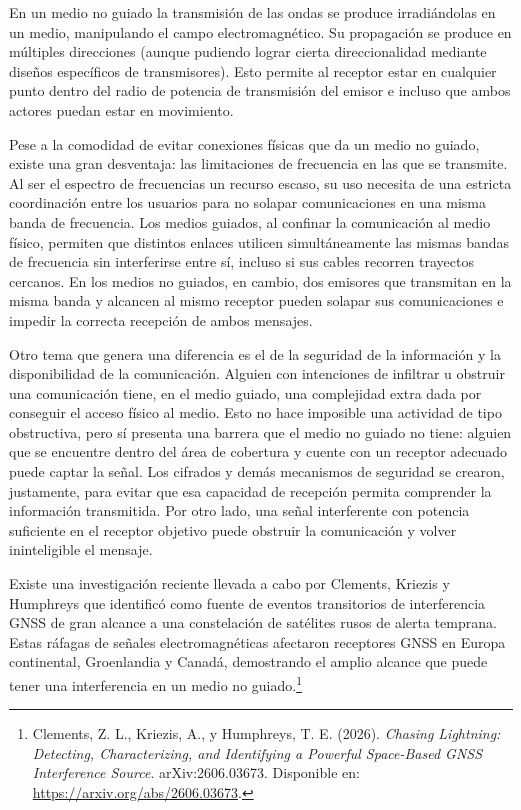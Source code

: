 \documentclass[11pt,a4paper]{article}
\begin{document}
En un medio no guiado la transmisión de las ondas se produce irradiándolas en un medio, manipulando el campo electromagnético. Su propagación se produce en múltiples direcciones (aunque pudiendo lograr cierta direccionalidad mediante diseños específicos de transmisores). Esto permite al receptor estar en cualquier punto dentro del radio de potencia de transmisión del emisor e incluso que ambos actores puedan estar en movimiento.

Pese a la comodidad de evitar conexiones físicas que da un medio no guiado, existe una gran desventaja: las limitaciones de frecuencia en las que se transmite. Al ser el espectro de frecuencias un recurso escaso, su uso necesita de una estricta coordinación entre los usuarios para no solapar comunicaciones en una misma banda de frecuencia. Los medios guiados, al confinar la comunicación al medio físico, permiten que distintos enlaces utilicen simultáneamente las mismas bandas de frecuencia sin interferirse entre sí, incluso si sus cables recorren trayectos cercanos. En los medios no guiados, en cambio, dos emisores que transmitan en la misma banda y alcancen al mismo receptor pueden solapar sus comunicaciones e impedir la correcta recepción de ambos mensajes.

Otro tema que genera una diferencia es el de la seguridad de la información y la disponibilidad de la comunicación. Alguien con intenciones de infiltrar u obstruir una comunicación tiene, en el medio guiado, una complejidad extra dada por conseguir el acceso físico al medio. Esto no hace imposible una actividad de tipo obstructiva, pero sí presenta una barrera que el medio no guiado no tiene: alguien que se encuentre dentro del área de cobertura y cuente con un receptor adecuado puede captar la señal. Los cifrados y demás mecanismos de seguridad se crearon, justamente, para evitar que esa capacidad de recepción permita comprender la información transmitida. Por otro lado, una señal interferente con potencia suficiente en el receptor objetivo puede obstruir la comunicación y volver ininteligible el mensaje.

Existe una investigación reciente llevada a cabo por Clements, Kriezis y Humphreys que identificó como fuente de eventos transitorios de interferencia GNSS de gran alcance a una constelación de satélites rusos de alerta temprana. Estas ráfagas de señales electromagnéticas afectaron receptores GNSS en Europa continental, Groenlandia y Canadá, demostrando el amplio alcance que puede tener una interferencia en un medio no guiado.\footnote{Clements, Z. L., Kriezis, A., y Humphreys, T. E. (2026). \textit{Chasing Lightning: Detecting, Characterizing, and Identifying a Powerful Space-Based GNSS Interference Source}. arXiv:2606.03673. Disponible en: \url{https://arxiv.org/abs/2606.03673}.}
\end{document}
